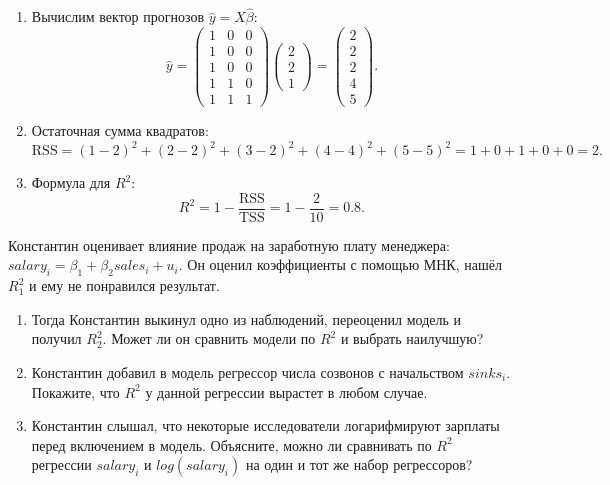 \documentclass[12pt]{article}
\begin{document}
\begin{sol}
\begin{enumerate}
    \item Вычислим вектор прогнозов $\hat{y} = X \hat{\beta}$:
    \[
    \hat{y} = \begin{pmatrix} 
      1 & 0 & 0 \\ 
      1 & 0 & 0 \\ 
      1 & 0 & 0 \\ 
      1 & 1 & 0 \\ 
      1 & 1 & 1 
    \end{pmatrix}
    \begin{pmatrix} 2 \\ 2 \\ 1 \end{pmatrix} = 
    \begin{pmatrix} 2 \\ 2 \\ 2 \\ 4 \\ 5 \end{pmatrix}.
    \]
    
    \item Остаточная сумма квадратов:
    \[
    \text{RSS} = (1-2)^2 + (2-2)^2 + (3-2)^2 + (4-4)^2 + (5-5)^2 = 1 + 0 + 1 + 0 + 0 = 2.
    \]
    
    \item Формула для $R^2$:
    \[
    R^2 = 1 - \frac{\text{RSS}}{\text{TSS}} = 1 - \frac{2}{10} = 0.8.
    \]
\end{enumerate}
\end{sol}

\begin{problem}

    Константин оценивает влияние продаж на заработную плату менеджера: $salary_i = \beta_1 + \beta_2 sales_i + u_i.$ Он оценил коэффициенты с помощью МНК, нашёл $R^2_1$ и ему не понравился результат. 

    \begin{enumerate}
        \item Тогда Константин выкинул одно из наблюдений, переоценил модель и получил $R^2_2$. Может ли он сравнить модели по $R^2$ и выбрать наилучшую?
        \item Константин добавил в модель регрессор числа созвонов с начальством $sinks_i$. Покажите, что $R^2$ у данной регрессии вырастет в любом случае.
        \item  Константин слышал, что некоторые исследователи логарифмируют зарплаты перед включением в модель. Объясните, можно ли сравнивать по $R^2$ регрессии $salary_i$ и $log(salary_i)$ на один и тот же набор регрессоров?
    \end{enumerate}
\end{problem}
\end{document}
